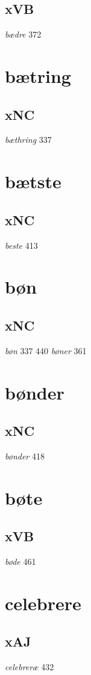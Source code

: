 \documentclass[a4paper,twocolumn]{article}
\begin{document}
\subsection{xVB}
\label{sec:org934120e}
\emph{bædre} 372 
\section{bætring}
\label{sec:orgd963983}
\subsection{xNC}
\label{sec:org8a5e6ec}
\emph{bæthring} 337 
\section{bætste}
\label{sec:orgb1acfad}
\subsection{xNC}
\label{sec:orgd0aaa9d}
\emph{beste} 413 
\section{bøn}
\label{sec:org9f73ee2}
\subsection{xNC}
\label{sec:org27279fb}
\emph{bøn} 337 440 \emph{bøner} 361 
\section{bønder}
\label{sec:org8ed9939}
\subsection{xNC}
\label{sec:orgfd1de74}
\emph{bønder} 418 
\section{bøte}
\label{sec:org5679ddb}
\subsection{xVB}
\label{sec:org3be0bc2}
\emph{bøde} 461 
\section{celebrere}
\label{sec:org3c38d7f}
\subsection{xAJ}
\label{sec:org1783499}
\emph{celebreræ} 432 
\end{document}
